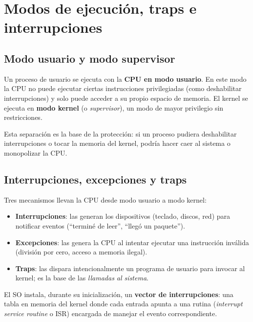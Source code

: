 \documentclass[11pt,a4paper]{article}
\begin{document}
\section{Modos de ejecución, traps e interrupciones}

\subsection{Modo usuario y modo supervisor}

\begin{definicion}
Un proceso de usuario se ejecuta con la \textbf{CPU en modo usuario}.
En este modo la CPU no puede ejecutar ciertas instrucciones
privilegiadas (como deshabilitar interrupciones) y solo puede acceder
a su propio espacio de memoria. El kernel se ejecuta en \textbf{modo
kernel} (o \emph{supervisor}), un modo de mayor privilegio sin
restricciones.
\end{definicion}

Esta separación es la base de la protección: si un proceso pudiera
deshabilitar interrupciones o tocar la memoria del kernel, podría
hacer caer al sistema o monopolizar la CPU.

\subsection{Interrupciones, excepciones y traps}

Tres mecanismos llevan la CPU desde modo usuario a modo kernel:

\begin{itemize}[leftmargin=*,nosep]
    \item \textbf{Interrupciones}: las generan los dispositivos
        (teclado, discos, red) para notificar eventos
        (``terminé de leer'', ``llegó un paquete'').
    \item \textbf{Excepciones}: las genera la CPU al intentar ejecutar
        una instrucción inválida (división por cero, acceso a memoria
        ilegal).
    \item \textbf{Traps}: las dispara intencionalmente un programa de
        usuario para invocar al kernel; es la base de las
        \emph{llamadas al sistema}.
\end{itemize}

El SO instala, durante su inicialización, un \textbf{vector de
interrupciones}: una tabla en memoria del kernel donde cada entrada
apunta a una rutina (\emph{interrupt service routine} o ISR)
encargada de manejar el evento correspondiente.
\end{document}
